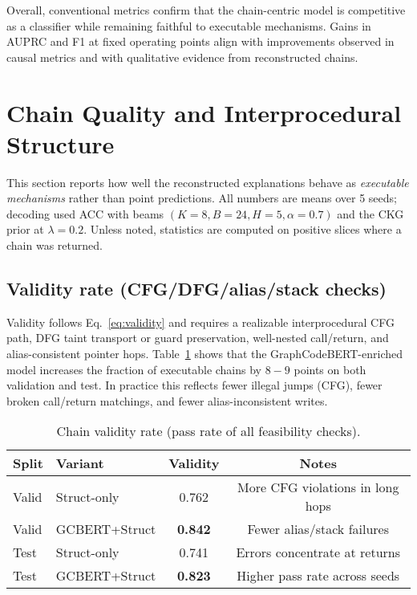 \documentclass{buthesis}
\begin{document}
\medskip
\noindent
Overall, conventional metrics confirm that the chain-centric model is competitive as a classifier while remaining faithful to executable mechanisms. Gains in AUPRC and F1 at fixed operating points align with improvements observed in causal metrics and with qualitative evidence from reconstructed chains.



\section{Chain Quality and Interprocedural Structure}
\label{sec:results-chain-quality}

This section reports how well the reconstructed explanations behave as \emph{executable mechanisms} rather than point predictions. All numbers are means over 5 seeds; decoding used ACC with beams $(K{=}8,B{=}24,H{=}5,\alpha{=}0.7)$ and the CKG prior at $\lambda{=}0.2$. Unless noted, statistics are computed on positive slices where a chain was returned.

\subsection{Validity rate (CFG/DFG/alias/stack checks)}
\label{sec:results-validity}

Validity follows Eq.~\eqref{eq:validity} and requires a realizable interprocedural CFG path, DFG taint transport or guard preservation, well-nested call/return, and alias-consistent pointer hops. Table~\ref{tab:validity} shows that the GraphCodeBERT-enriched model increases the fraction of executable chains by $8{-}9$ points on both validation and test. In practice this reflects fewer illegal jumps (CFG), fewer broken call/return matchings, and fewer alias-inconsistent writes.

\begin{table}[H]
\centering
\small
\setlength{\tabcolsep}{8pt}
\renewcommand{\arraystretch}{1.10}
\caption{Chain validity rate (pass rate of all feasibility checks).}
\label{tab:validity}
\begin{tabular}{l l c c}
\toprule
\textbf{Split} & \textbf{Variant} & \textbf{Validity} & \textbf{Notes}\\
\midrule
Valid & Struct-only        & 0.762 & More CFG violations in long hops \\
Valid & GCBERT{+}Struct   & \textbf{0.842} & Fewer alias/stack failures \\
Test  & Struct-only        & 0.741 & Errors concentrate at returns \\
Test  & GCBERT{+}Struct   & \textbf{0.823} & Higher pass rate across seeds \\
\bottomrule
\end{tabular}
\end{table}
\end{document}
